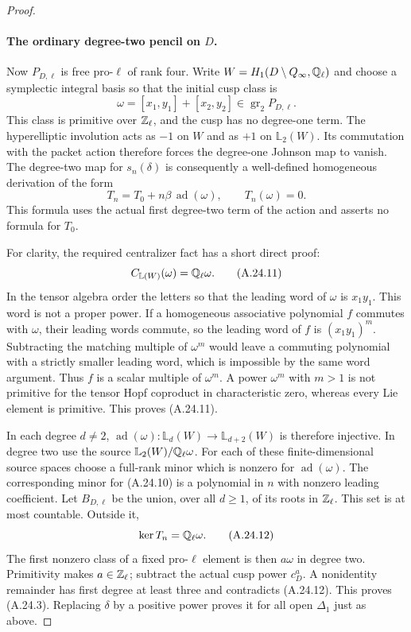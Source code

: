 \begin{proof}
\paragraph{The ordinary degree-two pencil on $D$.}
Now $P_{D,\ell}$ is free pro-$\ell$ of rank four. Write
$W=H_1(D\setminus Q_\infty,\mathbb Q_\ell)$ and choose a symplectic
integral basis so that the initial cusp class is
\[
                 \omega=[x_1,y_1]+[x_2,y_2]
                      \in\operatorname{gr}_2P_{D,\ell}.
\]
This class is primitive over $\mathbb Z_\ell$, and the cusp has
no degree-one term. The hyperelliptic involution acts as
$-1$ on $W$ and as $+1$ on $\mathbb L_2(W)$.
Its commutation with the packet action therefore forces
the degree-one Johnson map to vanish. The degree-two map
for $s_n(\delta)$ is consequently a well-defined
homogeneous derivation of the form
\[
          T_n=T_0+n\beta\,\operatorname{ad}(\omega),
                         \qquad T_n(\omega)=0.           \tag{A.24.10}
\]
This formula uses the actual first degree-two term of the
action and asserts no formula for $T_0$.

For clarity, the required centralizer fact has a short
direct proof:
\[
                C_{\mathbb L(W)}(\omega)=\mathbb Q_\ell\omega.
                                                        \tag{A.24.11}
\]
In the tensor algebra order the letters so that the
leading word of $\omega$ is $x_1y_1$.
This word is not a proper power. If a homogeneous
associative polynomial $f$ commutes with $\omega$, their
leading words commute, so the leading word of $f$ is
$(x_1y_1)^m$. Subtracting the matching multiple of
$\omega^m$ would leave a commuting polynomial with a
strictly smaller leading word, which is impossible by
the same word argument. Thus $f$ is a scalar multiple of
$\omega^m$. A power $\omega^m$ with $m>1$ is not primitive
for the tensor Hopf coproduct in characteristic zero,
whereas every Lie element is primitive. This proves
(A.24.11).

In each degree $d\ne2$,
$\operatorname{ad}(\omega):\mathbb L_d(W)\to
\mathbb L_{d+2}(W)$ is therefore injective. In degree two
use the source $\mathbb L_2(W)/\mathbb Q_\ell\omega$.
For each of these finite-dimensional source spaces
choose a full-rank minor which is nonzero for
$\operatorname{ad}(\omega)$.
The corresponding minor for (A.24.10) is a polynomial
in $n$ with nonzero leading coefficient. Let $B_{D,\ell}$
be the union, over all $d\ge1$, of its roots in $\mathbb Z_\ell$.
This set is at most countable. Outside it,
\[
                         \ker T_n=\mathbb Q_\ell\omega.
                                                        \tag{A.24.12}
\]
The first nonzero class of a fixed pro-$\ell$ element is
then $a\omega$ in degree two. Primitivity makes
$a\in\mathbb Z_\ell$; subtract the actual cusp power $c_D^a$.
A nonidentity remainder has first degree at least three
and contradicts (A.24.12). This proves (A.24.3).
Replacing $\delta$ by a positive power proves it for
all open $\Delta_1$ just as above.


\end{proof}
